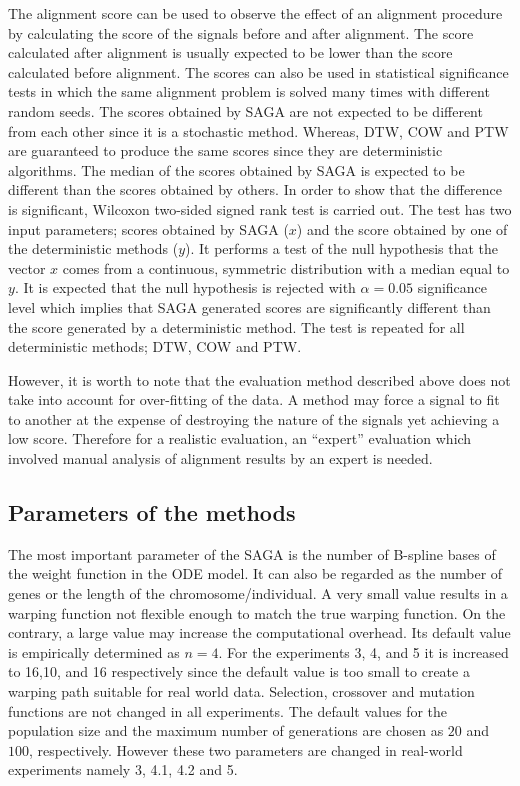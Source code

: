 \documentclass[number,1p,12pt]{elsarticle}
\begin{document}
The alignment score can be used to observe the effect of an alignment procedure by calculating the score of the signals before and after alignment. The score calculated after alignment is usually expected to be lower than the score calculated before alignment.  The scores can also be used in statistical significance tests in which the same alignment problem is solved many times with different random seeds. The scores obtained by SAGA are not expected to be different from each other since it is a stochastic method. Whereas, DTW, COW and PTW are guaranteed to produce the same scores since they are deterministic algorithms. The median of the scores obtained by SAGA is expected to be different than the scores obtained by others. In order to show that the difference is significant, Wilcoxon two-sided signed rank test is carried out. The test has two input parameters; scores obtained by SAGA ($x$) and the score obtained by one of the deterministic methods ($y$). It performs a test of the null hypothesis that the vector $x$ comes from a continuous, symmetric distribution with a median equal to $y$. It is expected that the null hypothesis is rejected with $\alpha=0.05$ significance level which implies that SAGA generated scores are significantly different than the score generated by a deterministic method. The test is repeated for all deterministic methods; DTW, COW and PTW.

However, it is worth to note that the evaluation method described above does not take into account for over-fitting of the data. A method may force a signal to fit to another at the expense of destroying the nature of the signals yet achieving a low score. Therefore for a realistic evaluation, an ``expert'' evaluation which involved manual analysis of alignment results by an expert is needed.

\subsection{Parameters of the methods}
The most important parameter of the SAGA is the number of B-spline bases of the weight function in the ODE model. It can also be regarded as the number of genes or the length of the chromosome/individual. A very small value results in a warping function not flexible enough to match the true warping function. On the contrary, a large value may increase the computational overhead. Its default value is empirically determined as $n=4$. For the experiments 3, 4, and 5 it is increased to 16,10, and 16 respectively since the default value is too small to create a warping path suitable for real world data. Selection, crossover and mutation functions are not changed in all experiments. The default values for the population size and the maximum number of generations are chosen as $20$ and $100$, respectively. However these two parameters are changed in real-world experiments namely 3, 4.1, 4.2 and 5.  
\end{document}
